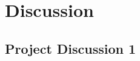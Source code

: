 \section{Discussion}\label{sec:Discussion}

\subsection{Project Discussion 1}\label{sec:project discussion}
